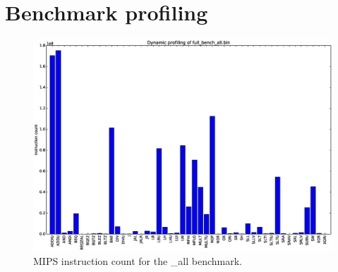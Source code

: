 \documentclass[final]{article}
\begin{document}
\section{Benchmark profiling}
\begin{figure}[H]
\centering
\centerline{\includegraphics[width=1.2\textwidth]{resources/bar-chart.eps}}
\caption{MIPS instruction count for the \_all benchmark.}
\label{fig:instruction-count}
\end{figure}
\end{document}
